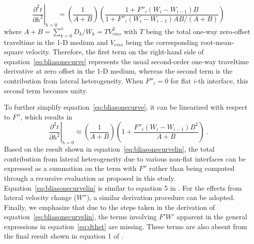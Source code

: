 \begin{equation}
\label{eq:bliasonecurve}
\left. \frac{\partial^2 t }{\partial h^2} \right\rvert_{h=0} = \left( \frac{1}{A +B} \right) \left( \frac{1+  F''_i (W_i - W_{i-1})B }{1+  F''_i (W_i - W_{i-1})AB /(A+B)} \right)
\end{equation}
where $ A+B = \sum^n_{k=0} D_k/W_k = T V^2_{rms}$ with $T$ being the total one-way zero-offset traveltime in the 1-D medium and $V_{rms}$ being the corresponding root-mean-square velocity. Therefore, the first term on the right-hand side of equation~\ref{eq:bliasonecurve} represents the usual second-order one-way traveltime derivative at zero offset in the 1-D medium, whereas the second term is the contribution from lateral heterogeneity. When $F''_i =0$ for flat $i$-th interface, this second term becomes unity.

To further simplify equation~\ref{eq:bliasonecurve}, it can be linearized with respect to $F''$, which results in
\begin{equation}
\label{eq:bliasonecurvelin}
\left. \frac{\partial^2 t }{\partial h^2} \right\rvert_{h=0} \approx \left( \frac{1}{A +B} \right) \left( 1+  \frac{F''_i (W_i - W_{i-1})B^2}{A+B} \right)~.
\end{equation}
Based on the result shown in equation~\ref{eq:bliasonecurvelin}, the total contribution from lateral heterogeneity due to various non-flat interfaces can be expressed as a summation  on the term with $F''$ rather than being computed through a recursive evaluation as proposed in this study. Equation~\ref{eq:bliasonecurvelin} is similar to equation 5 in \cite{blias2009stacking}. For the effects from lateral velocity change ($W''$), a similar derivation procedure can be adopted. Finally, we emphasize that due to the steps taken in the derivation of equation~\ref{eq:bliasonecurvelin}, the terms involving $F'W'$ apparent in the general expressions in equation~\ref{eq:dthet} are missing. These terms are also absent from the final result shown in equation 1 of \cite{blias2009stacking}.



